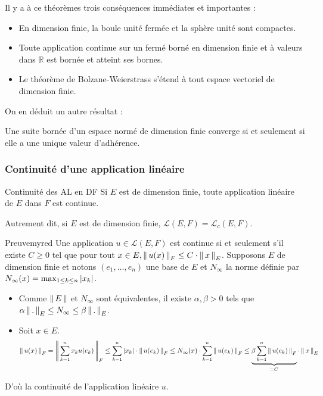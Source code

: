     Il y a à ce théorèmes trois conséquences immédiates et importantes :
    \begin{itemize}
        \item En dimension finie, la boule unité fermée et la sphère unité sont compactes.
        \item Toute application continue sur un fermé borné en dimension finie et à valeurs dans $\mathbb{R}$ est bornée et atteint ses bornes.
        \item Le théorème de Bolzane-Weierstrass s’étend à tout espace vectoriel de dimension finie.
    \end{itemize}

    On en déduit un autre résultat : 

    \begin{coro}{}{}
        Une suite bornée d’un espace normé de dimension finie converge si et seulement si elle a une unique valeur d’adhérence.
    \end{coro}

    \subsubsection{Continuité d’une application linéaire}

    \begin{theo}{Continuité des AL en DF}{}
        Si $E$ est de dimension finie, toute application linéaire de $E$ dans $F$ est continue.
    \end{theo}

    Autrement dit, si $E$ est de dimension finie, $\mathcal{L}(E,F) = \mathcal{L}_c(E,F)$.

    \begin{demo}{Preuve}{myred}
        Une application $u \in \mathcal{L}(E,F)$ est continue si et seulement s’il existe $C \geq 0$ tel que pour tout $x \in E, \left\lVert\,u(x)\,\right\rVert_F \leq C \cdot \left\lVert\,x\,\right\rVert_E$. Supposons $E$ de dimension finie et notons $(e_1,\ldots,e_n)$ une base de $E$ et $N_{\infty}$ la norme définie par $N_{\infty}(x) = \max_{1 \leq k \leq n} \left\lvert x_k\right\rvert$. 
        \begin{itemize}
            \item Comme $\left\lVert\,E\,\right\rVert$ et $N_{\infty}$ sont équivalentes, il existe $\alpha, \beta > 0$ tels que $\alpha \left\lVert\,.\,\right\rVert_E \leq N_{\infty} \leq \beta \left\lVert\,.\,\right\rVert_E$.
            \item Soit $x \in E$.
            \[ \left\lVert\,u(x)\,\right\rVert_F = \left\lVert\,\sum_{k=1}^n x_k u(e_k)\,\right\rVert_F \leq \sum_{k=1}^n \left\lvert x_k\right\rvert \cdot \left\lVert\,u(e_k)\,\right\rVert_F \leq N_{\infty}(x) \cdot \sum_{k=1}^n \left\lVert\,u(e_k)\,\right\rVert_F \leq \underbrace{\beta \sum_{k=1}^n \left\lVert\,u(e_k)\,\right\rVert_F}_{= C} \cdot \left\lVert\,x\,\right\rVert_E \]
        \end{itemize}
        D’où la continuité de l’application linéaire $u$.
    \end{demo}

